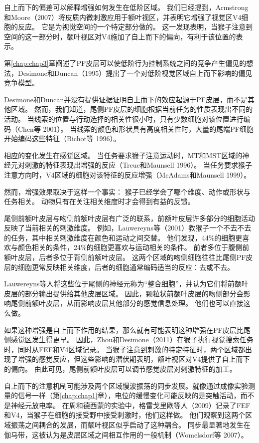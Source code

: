 自上而下的偏差可以解释增强如何发生在低阶区域。
我们已经提到，Armstrong和Moore（2007）将皮质内微刺激应用于额叶视区，并表明它增强了视觉区V4细胞的反应。
它是为视觉空间的一个特定部分做的。
这一发现表明，当猴子注意到空间的这一部分时，额叶视区对V4施加了自上而下的偏向，有利于该位置的表示。


第\ref{chap:chap3}章阐述了PF皮层可以使低阶行为控制系统之间的竞争产生偏见的想法，Desimone和Duncan（1995）提出了一个对低阶视觉区域自上而下影响的偏见竞争模型。


Desimone和Duncan并没有提供证据证明自上而下的效应起源于PF皮层，而不是其他区域。
然而，我们知道，尾侧PF皮层的细胞根据当前任务的性质表现出不同的活动。
当线索的位置与行动选择的相关性很小时，只有少数细胞对该位置进行编码（Chen等 2001）。
当线索的颜色和形状具有高度相关性时，大量的尾端PF细胞开始编码这些特征（Bichot等 1996）。


相应的变化发生在感觉区域。
当任务要求猴子注意运动时，MT和MST区域的神经元对刺激的特征表现出增强的反应（Treue和Maunsell 1996）。
当任务要求猴子注意方向时，V4区域的细胞对该特征的反应增强（McAdams和Maunsell 1999）。


然而，增强效果取决于这样一个事实：
猴子已经学会了哪个维度、动作或形状与任务相关。
动物只有在关注相关维度时才会得到有益的反馈。


尾侧前额叶皮层与吻侧前额叶皮层有广泛的联系，前额叶皮层许多部分的细胞活动反映了当前相关的刺激维度。
例如，Lauwereyns等（2001）教猴子一个不去不去的任务，其中相关刺激维度在颜色和运动之间交替。
他们发现，44\%的细胞更喜欢与颜色相关的条件，24\%的细胞更喜欢与运动相关的条件。
前者多位于腹侧前额叶皮层，后者多位于背侧前额叶皮层。
这两个区域的吻侧细胞往往比尾侧PF皮层的细胞更常反映相关维度，后者的细胞通常编码适当的反应：去或不去。


Lauwereyns等人将这些位于尾侧的神经元称为“整合细胞”，并认为它们将前额叶皮层的部分输出提供给其他皮层区域。
因此，颗粒状前额叶皮层的吻侧部分会影响尾侧前额叶皮层，从而影响皮层其他部分的感觉信息处理。
他们也可以直接这么做。


如果这种增强是自上而下作用的结果，那么就有可能表明这种增强在PF皮层比尾侧感觉区发生得更早。
因此，Zhou和Desimone（2011）在猴子执行视觉搜索任务时，同时从FEF和V4区域记录。
当猴子注意到刺激的特定特征时，两个区域都出现了增强的感觉反应，但这些影响的潜伏期表明，额叶视区对V4提供了自上而下的偏向。
由此可见，尾侧前额叶皮层可以调节感觉皮层对刺激特征的加工。


自上而下的注意机制可能涉及两个区域慢波振荡的同步发展。就像通过成像实验测量的信号一样（第\ref{chap:chap1}章），电位的缓慢变化可能反映的是突触活动，而不是神经元放电率。
在周和德西蒙的实验中，格雷戈里欧等人（2009）记录了FEF和V4，当猴子在细胞的接受野中接受刺激时，他们这样做。
他们观察到这两个区域振荡之间耦合的发展，而额叶视区似乎启动了这种耦合。
同步最显著地发生在伽马带，这被认为是皮层区域之间相互作用的一般机制（Womelsdorf等 2007）。



